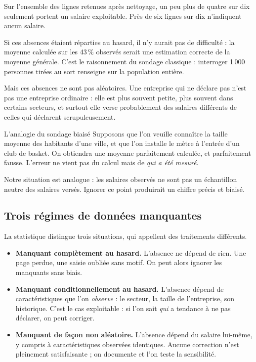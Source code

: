 \documentclass[11pt,a4paper]{article}
\begin{document}
Sur l'ensemble des lignes retenues après nettoyage, un peu plus de quatre
sur dix seulement portent un salaire exploitable. Près de six lignes sur
dix n'indiquent aucun salaire.

Si ces absences étaient réparties au hasard, il n'y aurait pas de
difficulté : la moyenne calculée sur les 43\,\% observés serait une
estimation correcte de la moyenne générale. C'est le raisonnement du
sondage classique : interroger 1\,000 personnes tirées au sort renseigne
sur la population entière.

Mais ces absences ne sont pas aléatoires. Une entreprise qui ne déclare
pas n'est pas une entreprise ordinaire : elle est plus souvent petite,
plus souvent dans certains secteurs, et surtout elle verse probablement
des salaires différents de celles qui déclarent scrupuleusement.

\begin{encadre}{L'analogie du sondage biaisé}
Supposons que l'on veuille connaître la taille moyenne des habitants d'une
ville, et que l'on installe le mètre à l'entrée d'un club de basket. On
obtiendra une moyenne parfaitement calculée, et parfaitement fausse.
L'erreur ne vient pas du calcul mais de \emph{qui a été mesuré}.

Notre situation est analogue : les salaires observés ne sont pas un
échantillon neutre des salaires versés. Ignorer ce point produirait un
chiffre précis et biaisé.
\end{encadre}

\subsection{Trois régimes de données manquantes}

La statistique distingue trois situations, qui appellent des traitements
différents.

\begin{itemize}[leftmargin=1.4em]
  \item \textbf{Manquant complètement au hasard.} L'absence ne dépend de
  rien. Une page perdue, une saisie oubliée sans motif. On peut alors
  ignorer les manquants sans biais.

  \item \textbf{Manquant conditionnellement au hasard.} L'absence dépend de
  caractéristiques que l'on \emph{observe} : le secteur, la taille de
  l'entreprise, son historique. C'est le cas exploitable : si l'on sait
  \emph{qui} a tendance à ne pas déclarer, on peut corriger.

  \item \textbf{Manquant de façon non aléatoire.} L'absence dépend du
  salaire lui-même, y compris à caractéristiques observées identiques.
  Aucune correction n'est pleinement satisfaisante ; on documente et l'on
  teste la sensibilité.
\end{itemize}
\end{document}
